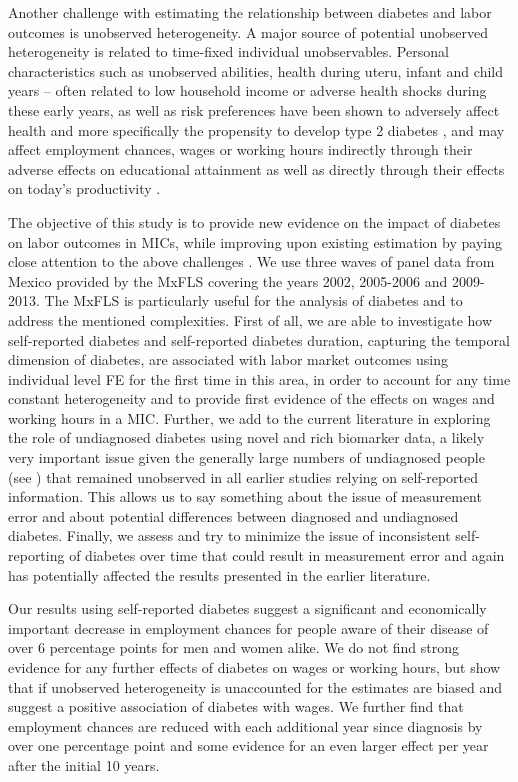 \documentclass[12pt,english,british]{article}
\begin{document}
Another challenge with estimating the relationship between diabetes and labor outcomes is unobserved heterogeneity. 
A major source of potential unobserved heterogeneity is related to time-fixed individual unobservables. Personal characteristics such as unobserved abilities, health during uteru, infant and child years -- often related to low household income or adverse health shocks during these early years, as well as risk preferences have been shown to adversely affect health and more specifically
the propensity to develop type 2 diabetes \citep{VanEwijk2011,Sotomayor2013,Li2010b},
and may affect employment chances, wages or working hours indirectly
through their adverse effects on educational attainment \citep{Ayyagari2011a}
as well as directly through their effects on today's productivity
\citep{Currie2013}.

The objective of this study is 
to provide new evidence on the impact of diabetes on labor outcomes in \ac{MICs}, while improving upon existing estimation by paying close attention to the above challenges . We use three waves  of panel data from Mexico provided by the \ac{MxFLS} covering the years 2002, 2005-2006 and 2009-2013. The \ac{MxFLS} is particularly useful for the analysis of diabetes and to address the mentioned complexities. First of all, we are able to investigate how self-reported diabetes and self-reported diabetes duration, capturing the temporal dimension of diabetes, are associated with
labor market outcomes using individual level \ac{FE} for the first time in this area, in order to account for any time constant heterogeneity and to provide first evidence of the effects on wages and working hours in a \ac{MIC}. Further, we add to the current literature in exploring the role of undiagnosed diabetes using novel and rich biomarker data, a likely very important issue given the generally large numbers of undiagnosed people (see \citet{Beagley2014}) that remained unobserved in all earlier studies relying on self-reported information. This allows us to say something about the issue of measurement error and about potential differences between diagnosed and undiagnosed diabetes. Finally, we assess and try to minimize the issue of inconsistent self-reporting of diabetes over time that could result in measurement error and again has potentially affected the results presented in the earlier literature.

Our results using self-reported diabetes suggest a significant and economically important decrease in employment chances for people aware of their disease of over 6 percentage points for men and women alike. We do not find strong evidence for any further effects of diabetes on wages or working hours, but show that if unobserved heterogeneity is unaccounted for the estimates are biased and suggest a positive association of diabetes with wages. We further find that employment chances are reduced with each additional year since diagnosis by over one percentage point and some evidence for an even larger effect per year after the initial 10 years. 
\end{document}
